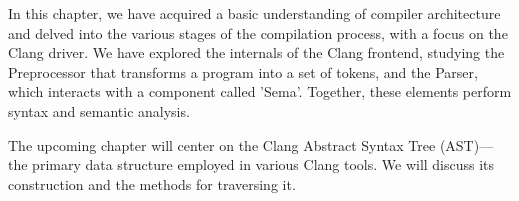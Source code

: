 In this chapter, we have acquired a basic understanding of compiler architecture and delved into the various stages of the compilation process, with a focus on the Clang driver. We have explored the internals of the Clang frontend, studying the Preprocessor that transforms a program into a set of tokens, and the Parser, which interacts with a component called 'Sema'. Together, these elements perform syntax and semantic analysis.

The upcoming chapter will center on the Clang Abstract Syntax Tree (AST)—the primary data structure employed in various Clang tools. We will discuss its construction and the methods for traversing it.
